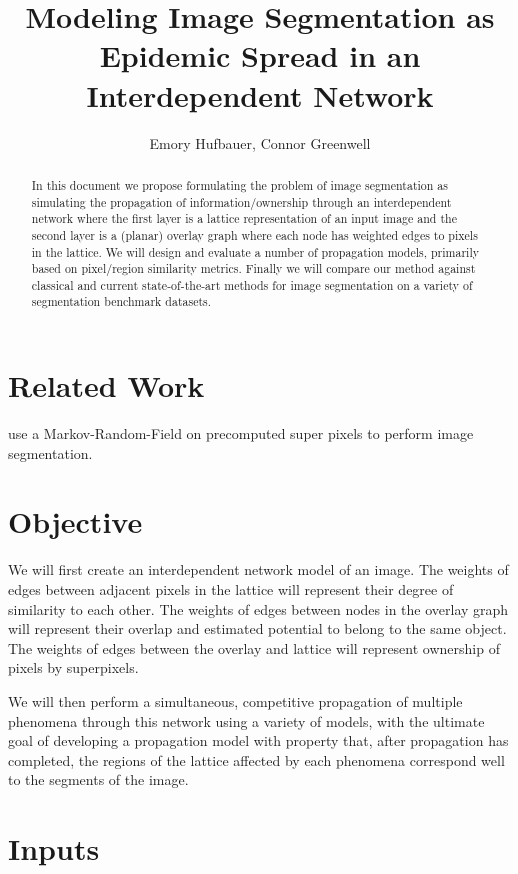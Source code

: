 \documentclass[twocolumn]{article}
\title{Modeling Image Segmentation as Epidemic Spread in an Interdependent Network}
\author{Emory Hufbauer, Connor Greenwell}
\date{}
\begin{document}
\maketitle

\begin{abstract}
In this document we propose formulating the problem of image segmentation as simulating the propagation of
information/ownership through an interdependent network where the first layer is a lattice representation of an input image
and the second layer is a (planar) overlay graph where each node has weighted edges to pixels in the lattice. We will design
and evaluate a number of propagation models, primarily based on pixel/region similarity metrics. Finally we will compare our
method against classical and current state-of-the-art methods for image segmentation on a variety of segmentation benchmark
datasets. 
\end{abstract}

\section{Related Work}

\cite{pei2014saliency} use a Markov-Random-Field on precomputed super pixels to perform image segmentation.

\section{Objective}

We will first create an interdependent network model of an image. The weights of edges between adjacent pixels in the lattice
will represent their degree of similarity to each other. The weights of edges between nodes in the overlay graph will
represent their overlap and estimated potential to belong to the same object. The weights of edges between the overlay and
lattice will represent ownership of pixels by superpixels.

We will then perform a simultaneous, competitive propagation of multiple phenomena through this network using a variety of
models, with the ultimate goal of developing a propagation model with property that, after propagation has completed, the
regions of the lattice affected by each phenomena correspond well to the segments of the image.

\section{Inputs}
\end{document}
